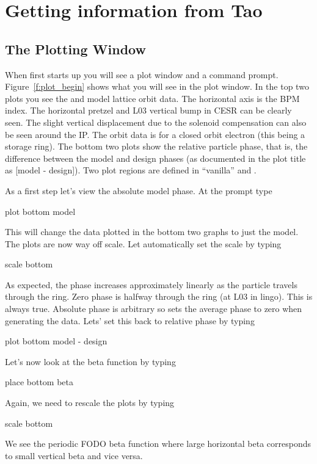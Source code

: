 \section{Getting information from Tao}
\label{s:get_info}

\subsection{The Plotting Window}

When \tao first starts up you will see a plot window and a command
prompt.  Figure~\ref{f:plot_begin} shows what you will see in the plot
window. In the top two plots you see the  and  model
lattice orbit data. The horizontal axis is the \cesr BPM index. The
horizontal pretzel and L03 vertical bump in CESR can be clearly
seen. The slight vertical displacement due to the solenoid
compensation can also be seen around the IP. The orbit data is for a
closed orbit electron (this being a storage ring). The bottom two
plots show the relative particle phase, that is, the difference
between the model and design phases (as documented in the plot title
as [model - design]). Two plot regions are defined in ``vanilla'' \tao
{} and .

As a first step let's view the absolute model phase. At the 
prompt type
\begin{example}
  plot bottom model
\end{example}
This will change the data plotted in the bottom two graphs to just the
model.  The plots are now way off scale. Let \tao automatically set
the scale by typing
\begin{example}
  scale bottom
\end{example}
As expected, the phase increases approximately linearly as the
particle travels through the ring. Zero phase is halfway through the
ring (at L03 in \cesr lingo).  This is always true. Absolute phase is
arbitrary so \tao sets the average phase to zero when generating the
data. Lets' set this back to relative phase by typing
\begin{example}
  plot bottom model - design
\end{example}


Let's now look at the beta function by typing
\begin{example}
  place bottom beta
\end{example}
Again, we need to rescale the plots by typing
\begin{example}
  scale bottom
\end{example}
We see the periodic FODO beta function where large horizontal beta
corresponds to small vertical beta and vice versa.

